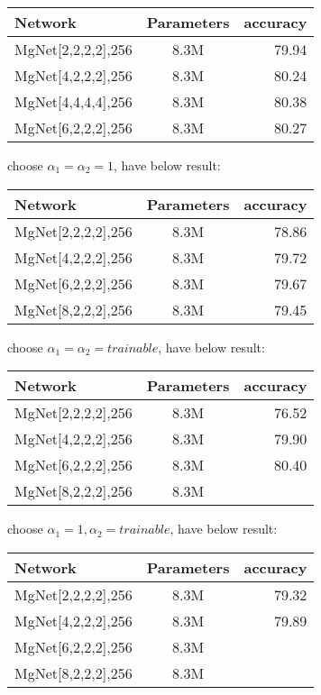 \begin{tabular}{| l | c | r |}
	\hline
	Network                  &     Parameters   &       accuracy   \\
	\hline
	MgNet[2,2,2,2],256     &      8.3M          &        79.94       \\
	\hline
	MgNet[4,2,2,2],256     &      8.3M          &        80.24       \\
	\hline
	MgNet[4,4,4,4],256     &      8.3M          &        80.38      \\
	\hline
	MgNet[6,2,2,2],256     &      8.3M          &        80.27       \\
	\hline
\end{tabular}

\vbox{}
choose $\alpha_1=\alpha_2=1$, have below result:\\
\begin{tabular}{| l | c | r |}
	\hline
	Network                &     Parameters     &       accuracy   \\
	\hline
	MgNet[2,2,2,2],256     &      8.3M          &        78.86       \\
	\hline
	MgNet[4,2,2,2],256     &      8.3M          &        79.72       \\
	\hline
	MgNet[6,2,2,2],256     &      8.3M          &        79.67       \\
	\hline
	MgNet[8,2,2,2],256     &      8.3M          &        79.45       \\
	\hline
\end{tabular}

\vbox{}
choose $\alpha_1=\alpha_2=trainable$, have below result:\\
\begin{tabular}{| l | c | r |}
	\hline
	Network                &     Parameters     &       accuracy   \\
	\hline
	MgNet[2,2,2,2],256     &      8.3M          &        76.52       \\
	\hline
	MgNet[4,2,2,2],256     &      8.3M          &        79.90       \\
	\hline
	MgNet[6,2,2,2],256     &      8.3M          &        80.40       \\
	\hline
	MgNet[8,2,2,2],256     &      8.3M          &               \\
	\hline
\end{tabular}

\vbox{}
choose $\alpha_1=1,\alpha_2=trainable$, have below result:\\
\begin{tabular}{| l | c | r |}
	\hline
	Network                &     Parameters     &       accuracy   \\
	\hline
	MgNet[2,2,2,2],256     &      8.3M          &        79.32       \\
	\hline
	MgNet[4,2,2,2],256     &      8.3M          &        79.89       \\
	\hline
	MgNet[6,2,2,2],256     &      8.3M          &                    \\
	\hline
	MgNet[8,2,2,2],256     &      8.3M          &                    \\
	\hline
\end{tabular}

